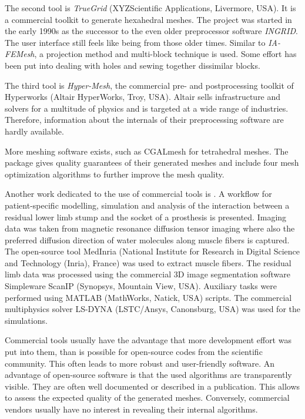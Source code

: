 The second tool is \emph{TrueGrid} (XYZScientific Applications, Livermore, USA). It is a commercial toolkit to generate hexahedral meshes. The project was started in the early 1990s as the successor to the even older preprocessor software \emph{INGRID}. The user interface still feels like being from those older times. Similar to \emph{IA-FEMesh}, a projection method and multi-block technique is used. Some effort has been put into dealing with holes and sewing together dissimilar blocks.

The third tool is \emph{Hyper-Mesh}, the commercial pre- and postprocessing toolkit of Hyperworks (Altair HyperWorks, Troy, USA).
Altair sells infrastructure and solvers for a multitude of physics and is targeted at a wide range of industries. 
Therefore, information about the internals of their preprocessing software are hardly available.

More meshing software exists, such as CGALmesh \cite{Jamin2015CGALmesh} for tetrahedral meshes. The package gives quality guarantees of their generated meshes and include four mesh optimization algorithms to further improve the mesh quality.

Another work dedicated to the use of commercial tools is \cite{Ellankavi2018}. A workflow for patient-specific modelling, simulation and analysis of the interaction between a residual lower limb stump and the socket of a prosthesis is presented. Imaging data was taken from magnetic resonance diffusion tensor imaging where also the preferred diffusion direction of water molecules along muscle fibers is captured. The open-source tool MedInria (National Institute for Research in Digital Science and Technology (Inria), France) \cite{vichot2012cardiac} was used to extract muscle fibers. The residual limb data was processed using the commercial 3D image segmentation software Simpleware ScanIP (Synopsys, Mountain View, USA). Auxiliary tasks were performed using MATLAB (MathWorks,	Natick, USA) scripts. The commercial multiphysics solver LS-DYNA (LSTC/Ansys, Canonsburg, USA) was used for the simulations.

Commercial tools usually have the advantage that more development effort was put into them, than is possible for open-source codes from the scientific community. This often leads to more robust and user-friendly software. An advantage of open-source software is that the used algorithms are transparently visible. They are often well documented or described in a publication. This allows to assess the expected quality of the generated meshes. Conversely, commercial vendors usually have no interest in revealing their internal algorithms.

